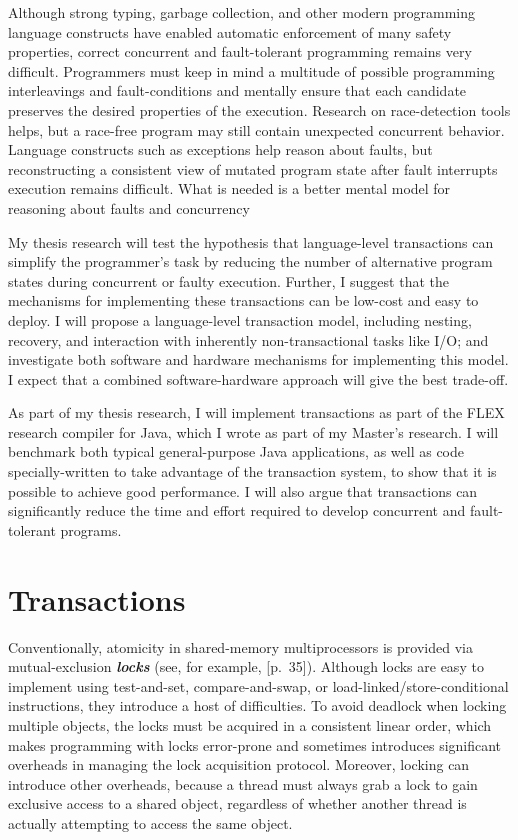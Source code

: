 \documentclass[12pt,oneside]{article}
\newcommand{\defn}[1]           {{\textit{\textbf{\boldmath #1}}}}
\begin{document}
Although strong typing, garbage collection, and other modern
programming language constructs have enabled automatic enforcement of
many safety properties, correct concurrent and fault-tolerant
programming remains very difficult.  Programmers must keep in mind a
multitude of possible programming interleavings and fault-conditions
and mentally ensure that each candidate preserves the desired
properties of the execution.  Research on race-detection tools helps,
but a race-free program may still contain unexpected concurrent
behavior.  Language constructs such as exceptions help reason about
faults, but reconstructing a consistent view of mutated program state
after fault interrupts execution remains difficult.  What is needed is
a better mental model for reasoning about faults and concurrency

My thesis research will test the hypothesis that language-level
transactions can simplify the programmer's task by reducing the number
of alternative program states during concurrent or faulty execution.
Further, I suggest that the mechanisms for implementing
these transactions can be low-cost and easy to deploy.  I will
propose a language-level transaction model, including nesting,
recovery, and interaction with inherently non-transactional tasks like
I/O; and investigate both software and hardware mechanisms for
implementing this model.  I expect that a combined
software-hardware approach will give the best trade-off.

As part of my thesis research, I will implement transactions as part
of the FLEX research compiler for Java, which I wrote as part of my
Master's research.  I will benchmark both typical general-purpose Java
applications, as well as code specially-written to take advantage of
the transaction system, to show that it is possible to achieve good
performance.  I will also argue that transactions can significantly
reduce the time and effort required to develop concurrent and
fault-tolerant programs.

\section{Transactions}

Conventionally, atomicity in shared-memory multiprocessors is provided
via mutual-exclusion \defn{locks} (see, for example,
\cite{Tanenbaum92}[p.~35]).  Although locks are easy to
implement using test-and-set, compare-and-swap, or
load-linked/{\bp}store-conditional instructions, they introduce a host of
difficulties.  To avoid deadlock when locking multiple objects, the
locks must be acquired in a consistent linear order, which makes
programming with locks error-prone and sometimes introduces
significant overheads in managing the lock acquisition protocol.
Moreover, locking can introduce other overheads, because a thread must
always grab a lock to gain exclusive access to a shared object,
regardless of whether another thread is actually attempting to access
the same object.
\end{document}
